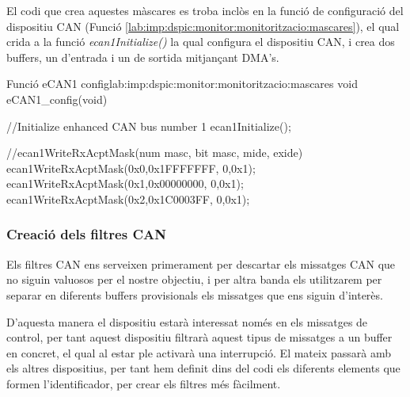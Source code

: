 El codi que crea aquestes màscares es troba inclòs en la funció de configuració del dispositiu CAN (Funció \ref{lab:imp:dspic:monitor:monitoritzacio:mascares}), el qual crida a la funció \emph{ecan1Initialize()} la qual configura el dispositiu CAN, i crea dos buffers, un d'entrada i un de sortida mitjançant DMA's.

\begin{code_c}{Funció eCAN1 config}{lab:imp:dspic:monitor:monitoritzacio:mascares}
void eCAN1_config(void)
{
	//Initialize enhanced CAN bus number 1
	ecan1Initialize();

	//ecan1WriteRxAcptMask(num masc, bit masc, mide, exide)
	ecan1WriteRxAcptMask(0x0,0x1FFFFFFF, 0,0x1);
	ecan1WriteRxAcptMask(0x1,0x00000000, 0,0x1);
	ecan1WriteRxAcptMask(0x2,0x1C0003FF, 0,0x1);
}
\end{code_c}

\subsubsection{Creació dels filtres CAN}\label{lab:imp:dspic:monitor:can:filtres}

Els filtres CAN ens serveixen primerament per descartar els missatges CAN que no siguin valuosos per el nostre objectiu, i per altra banda els utilitzarem per separar en diferents buffers provisionals els missatges que ens siguin d'interès.

D'aquesta manera el dispositiu \Actuador estarà interessat només en els missatges de control, per tant aquest dispositiu filtrarà aquest tipus de missatges a un buffer en concret, el qual al estar ple activarà una interrupció.
El mateix passarà amb els altres dispositius, per tant hem definit dins del codi els diferents elements que formen l'identificador, per crear els filtres més fàcilment.


